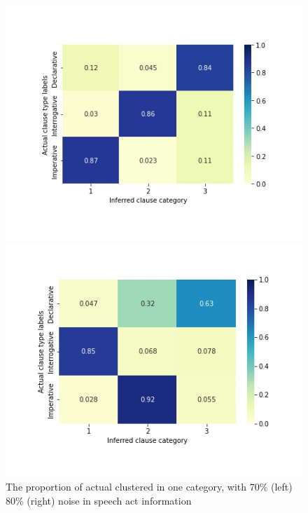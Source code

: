 \begin{figure}[H]
\begin{minipage}[b]{0.45\linewidth}	
    \centering
    \includegraphics[width=1.2\textwidth]{figures/target-heatrev-70.jpg}
\end{minipage}
\begin{minipage}[b]{0.45\linewidth}	
    \centering
    \includegraphics[width=1.2\textwidth]{figures/target-heatrev-80.jpg}
\end{minipage}   
    \caption{The proportion of actual \diis{} clustered in one category, with 70\% (left) 80\% (right) noise in speech act information}
    \label{fig:noisy80-heatrev}
\end{figure}



